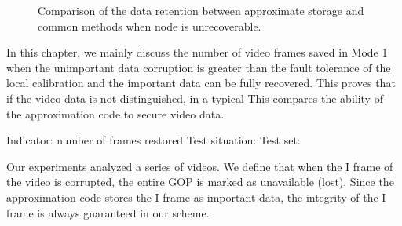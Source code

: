 \documentclass[sigconf]{acmart}
\begin{document}
\begin{figure}
\caption{Comparison of the data retention  between approximate storage and common methods when node is unrecoverable.}
\end{figure}


In this chapter, we mainly discuss the number of video frames saved in Mode 1 when the unimportant data corruption is greater than the fault tolerance of the local calibration and the important data can be fully recovered.
This proves that if the video data is not distinguished, in a typical
This compares the ability of the approximation code to secure video data.

Indicator: number of frames restored
Test situation:
Test set:

Our experiments analyzed a series of videos. We define that when the I frame of the video is corrupted, the entire GOP is marked as unavailable (lost).
Since the approximation code stores the I frame as important data, the integrity of the I frame is always guaranteed in our scheme.
\end{document}
